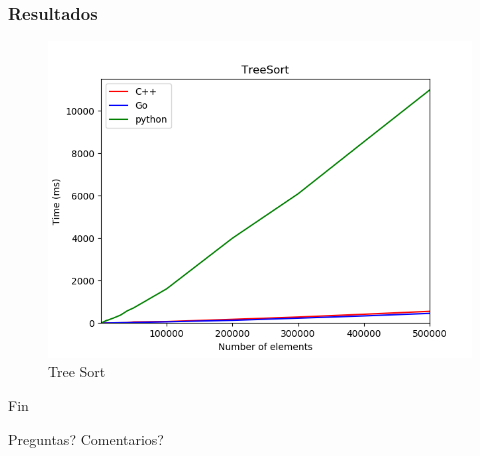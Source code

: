 \documentclass[
	11pt, %
]{beamer}
\begin{document}
\begin{frame}
	\frametitle{Resultados}
	
	\begin{figure}
		\includegraphics[width=0.8\linewidth]{treeSort_1.png}
		\caption{Tree Sort}
	\end{figure}
\end{frame}


\begin{frame}[plain] %
	\begin{center}
		{\Huge Fin}
		
		\bigskip\bigskip %
		
		{\LARGE Preguntas? Comentarios?}
	\end{center}
\end{frame}

\end{document}

